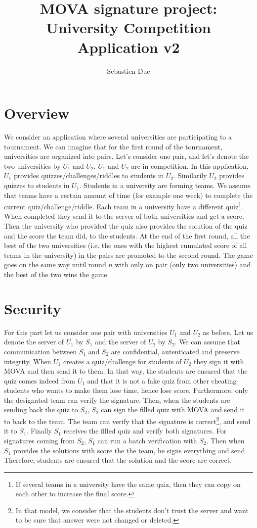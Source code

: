 \documentclass[12pt,a4paper]{article}
\title{MOVA signature project: University Competition Application v2}
\author{Sebastien Duc}
\date{}
\begin{document}
    \maketitle

    \section{Overview}
    We consider an application where several universities are participating to a tournament.
    We can imagine that for the first round of the tournament, universities are organized into
    pairs. Let's consider one pair, and let's denote the two universities by $U_1$ and $U_2$. $U_1$ and $U_2$  are in competition.
    In this application, $U_1$ provides quizzes/challenges/riddles to students in $U_2$. Similarily $U_2$ provides quizzes to students in $U_1$.
    Students in a university are forming teams. We assume that teams have a certain amount of time (for example one week) to complete the current quiz/challenge/riddle. 
    Each team in a university have a different quiz\footnote{If several teams in a university have the same quiz, then they can copy on each other to increase the final score.}.
    When completed they send it to the server of both universities and get a score. Then the university who provided the quiz also provides the solution of the quiz and the score the 
    team did, to the students. At the end of the first round, all the best of the two universities 
    (i.e. the ones with the highest cumulated score of all teams in the university) in the pairs are 
    promoted to the second round. The game goes on the same way until round $n$ with only on pair (only two universities) and the best of the two wins the game.

    \section{Security}
    For this part let us consider one pair with universities $U_1$ and $U_2$ as before. Let us denote the server of $U_1$ by $S_1$ and the server of $U_2$ by $S_2$.
    We can assume that communication between $S_1$ and $S_2$ are confidential, autenticated and preserve integrity.
    When $U_1$ creates a quiz/challenge for students of $U_2$ they sign it with MOVA and then send it to them. In that way, the students are ensured that the quiz comes indeed
    from $U_1$ and that it is not a fake quiz from other cheating students who wants to make them lose time, hence lose score. Furthermore, only the designated team can verify the signature.
    Then, when the students are sending back the quiz to $S_2$, $S_2$ can sign the filled quiz with MOVA and send it to back to the team. The team can verify that the signature 
    is correct\footnote{In that model, we consider that the students don't trust the server and want to be sure that answer were not changed or deleted.},
    and send it to $S_1$. Finally $S_1$ receives the filled quiz and verify both signatures.
    For signatures coming from $S_2$, $S_1$ can run a batch verification with $S_2$.
    Then when $S_1$ provides the solutions with score the the team, he signs everything and send. Therefore, students are ensured that the solution and the score are correct.
\end{document}

